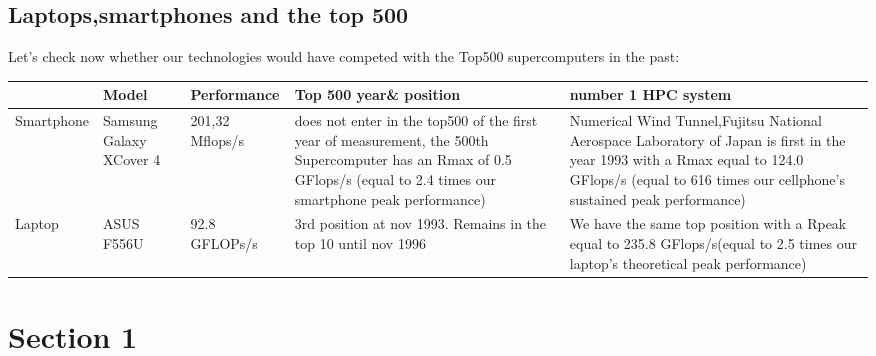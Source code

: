 \documentclass[11pt]{scrartcl} %
\begin{document}
\subsection{Laptops,smartphones and the top 500}
Let's check now whether our technologies would have competed with the Top500 supercomputers in the past:
\begin{adjustwidth}{-2cm}{}
	\begin{tabular}[H]{p{}| p{}| p{} | p{}| p{}}
		\hline
			&Model&Performance&Top 500 year\& position&number 1 HPC system\\
			\hline
			Smartphone&Samsung Galaxy XCover 4 &201,32 Mflops/s &does not enter in the top500 of the first year of measurement, the 500th Supercomputer has an Rmax of 0.5 GFlops/s (equal to 2.4 times our smartphone peak performance)& Numerical Wind Tunnel,Fujitsu National Aerospace Laboratory of Japan is first in the year 1993 with a Rmax equal to 124.0 GFlops/s (equal to 616 times our cellphone's sustained peak performance)\\
			\hline
			Laptop&ASUS F556U&92.8 GFLOPs/s& 3rd position at nov 1993. Remains in the top 10 until nov 1996 & We have the same top position with a Rpeak equal to 235.8 GFlops/s(equal to 2.5 times our laptop's theoretical peak performance)\\
		\end{tabular}
\end{adjustwidth}



\section{Section 1}
\end{document}

